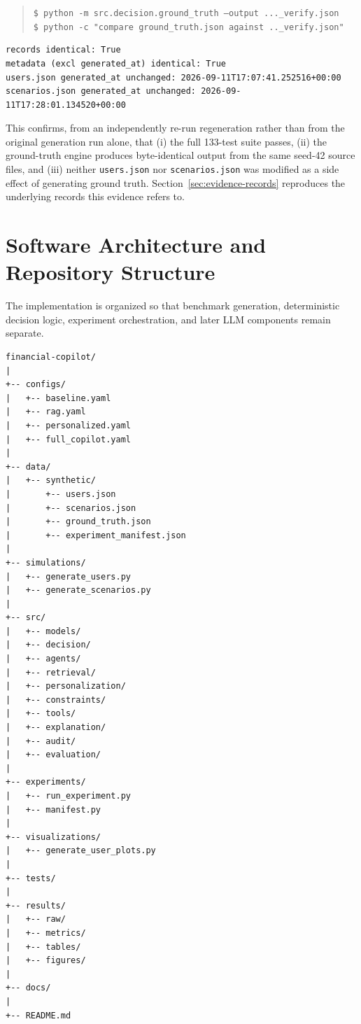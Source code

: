 \documentclass[12pt,a4paper]{article}
\begin{document}
\begin{quote}
\texttt{\$ python -m src.decision.ground\_truth --output ...\_verify.json}\\
\texttt{\$ python -c "compare ground\_truth.json against ..\_verify.json"}
\end{quote}
{\small
\begin{verbatim}
records identical: True
metadata (excl generated_at) identical: True
users.json generated_at unchanged: 2026-09-11T17:07:41.252516+00:00
scenarios.json generated_at unchanged: 2026-09-11T17:28:01.134520+00:00
\end{verbatim}
}

This confirms, from an independently re-run regeneration rather than from the original generation run alone, that (i) the full 133-test suite passes, (ii) the ground-truth engine produces byte-identical output from the same seed-42 source files, and (iii) neither \texttt{users.json} nor \texttt{scenarios.json} was modified as a side effect of generating ground truth. Section~\ref{sec:evidence-records} reproduces the underlying records this evidence refers to.

\section{Software Architecture and Repository Structure}

The implementation is organized so that benchmark generation, deterministic decision logic, experiment orchestration, and later LLM components remain separate.

\begin{verbatim}
financial-copilot/
|
+-- configs/
|   +-- baseline.yaml
|   +-- rag.yaml
|   +-- personalized.yaml
|   +-- full_copilot.yaml
|
+-- data/
|   +-- synthetic/
|       +-- users.json
|       +-- scenarios.json
|       +-- ground_truth.json
|       +-- experiment_manifest.json
|
+-- simulations/
|   +-- generate_users.py
|   +-- generate_scenarios.py
|
+-- src/
|   +-- models/
|   +-- decision/
|   +-- agents/
|   +-- retrieval/
|   +-- personalization/
|   +-- constraints/
|   +-- tools/
|   +-- explanation/
|   +-- audit/
|   +-- evaluation/
|
+-- experiments/
|   +-- run_experiment.py
|   +-- manifest.py
|
+-- visualizations/
|   +-- generate_user_plots.py
|
+-- tests/
|
+-- results/
|   +-- raw/
|   +-- metrics/
|   +-- tables/
|   +-- figures/
|
+-- docs/
|
+-- README.md
\end{verbatim}
\end{document}
